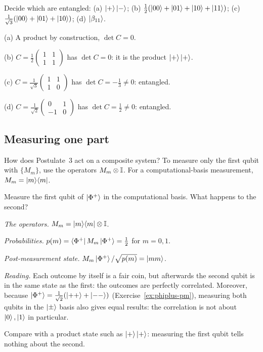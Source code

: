 \begin{example}\label{ex:entangled-or-not}
  Decide which are entangled: (a) $\left|+\right\rangle\left|-\right\rangle$; (b) $\frac12(\left|00\right\rangle+\left|01\right\rangle+\left|10\right\rangle+\left|11\right\rangle)$; (c) $\frac1{\sqrt3}(\left|00\right\rangle+\left|01\right\rangle+\left|10\right\rangle)$; (d) $\left|\beta_{11}\right\rangle$.
\end{example}
\begin{solution}
  \begin{steps}
    \item (a) A product by construction, $\det C=0$.
    \item (b) $C=\tfrac12\begin{pmatrix}1&1\\1&1\end{pmatrix}$ has $\det C=0$: it is the product $\left|+\right\rangle\left|+\right\rangle$.
    \item (c) $C=\tfrac1{\sqrt3}\begin{pmatrix}1&1\\1&0\end{pmatrix}$ has $\det C=-\tfrac13\neq0$: entangled.
    \item (d) $C=\tfrac1{\sqrt2}\begin{pmatrix}0&1\\-1&0\end{pmatrix}$ has $\det C=\tfrac12\neq0$: entangled.
  \end{steps}
\end{solution}

\subsection{Measuring one part}

How does Postulate~3 act on a composite system? To measure only the first qubit with $\{M_m\}$, use the operators $M_m\otimes\mathbb{I}$. For a computational-basis measurement, $M_m=\left|m\right\rangle\!\left\langle m\right|$.

\begin{example}\label{ex:partial}
  Measure the first qubit of $\left|\Phi^+\right\rangle$ in the computational basis. What happens to the second?
\end{example}
\begin{solution}
  \begin{steps}
    \item \emph{The operators.} $M_m=\left|m\right\rangle\!\left\langle m\right|\otimes\mathbb{I}$.
    \item \emph{Probabilities.} $p(m)=\left\langle\Phi^+\right|M_m\left|\Phi^+\right\rangle=\tfrac12$ for $m=0,1$.
    \item \emph{Post-measurement state.} $M_m\left|\Phi^+\right\rangle/\sqrt{p(m)}=\left|mm\right\rangle$.
    \item \emph{Reading.} Each outcome by itself is a fair coin, but afterwards the second qubit is in the same state as the first: the outcomes are perfectly correlated. Moreover, because $\left|\Phi^+\right\rangle=\frac1{\sqrt2}(\left|++\right\rangle+\left|--\right\rangle)$ (Exercise~\ref{ex:phiplus-pm}), measuring both qubits in the $\left|\pm\right\rangle$ basis also gives equal results: the correlation is not about $\left|0\right\rangle,\left|1\right\rangle$ in particular.
  \end{steps}
  Compare with a product state such as $\left|+\right\rangle\left|+\right\rangle$: measuring the first qubit tells nothing about the second.
\end{solution}

